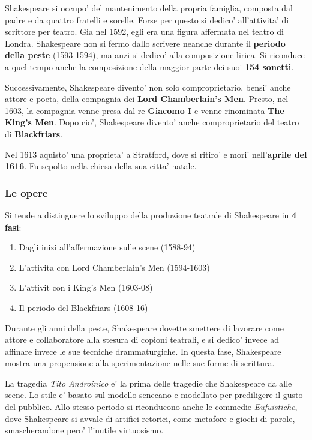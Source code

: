 \documentclass{article}
\begin{document}
{{    Shakespeare si occupo' del mantenimento della propria famiglia, composta dal padre e da quattro fratelli e sorelle. Forse per questo si dedico' all'attivita' di scrittore per teatro. Gia nel 1592, egli era una figura affermata nel teatro di Londra. Shakespeare non si fermo dallo scrivere neanche durante il \textbf{periodo della peste} \small{(1593-1594)}, ma anzi si dedico' alla composizione lirica. Si riconduce a quel tempo anche la composizione della maggior parte dei suoi \textbf{154 sonetti}.

    Successivamente, Shakespeare divento' non solo comproprietario, bensi' anche attore e poeta, della compagnia dei \textbf{Lord Chamberlain's Men}. Presto, nel 1603, la compagnia venne presa dal re \textbf{Giacomo I} e venne rinominata \textbf{The King's Men}. Dopo cio', Shakespeare divento' anche comproprietario del teatro di \textbf{Blackfriars}.

    Nel 1613 aquisto' una proprieta' a Stratford, dove si ritiro' e mori' nell'\textbf{aprile del 1616}. Fu sepolto nella chiesa della sua citta' natale.

    \subsubsection{Le opere} %
    Si tende a distinguere lo sviluppo della produzione teatrale di Shakespeare in \textbf{4 fasi}:
    \begin{enumerate}
      \item Dagli inizi all'affermazione sulle scene (1588-94)
      \item L'attivita con Lord Chamberlain's Men (1594-1603)
      \item L'attivit con i King's Men (1603-08)
      \item Il periodo del Blackfriars (1608-16)
    \end{enumerate}

    Durante gli anni della peste, Shakespeare dovette smettere di lavorare come attore e collaboratore alla stesura di copioni teatrali, e si dedico' invece ad affinare invece le sue tecniche drammaturgiche. In questa fase, Shakespeare mostra una propensione alla sperimentazione nelle sue forme di scrittura.

    La tragedia \textit{Tito Androinico} e' la prima delle tragedie che Shakespeare da alle scene. Lo stile e' basato sul modello senecano e modellato per prediligere il gusto del pubblico. Allo stesso periodo si riconducono anche le commedie \textit{Eufuistiche}, dove Shakespeare si avvale di artifici retorici, come metafore e giochi di parole, smascherandone pero' l'inutile virtuosismo.

}}
\end{document}
